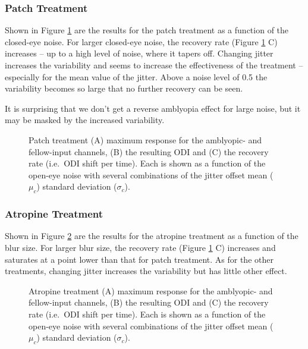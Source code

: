 \documentclass[
  onecolumn]{article}
\begin{document}
\hypertarget{patch-treatment-1}{%
\subsubsection{Patch Treatment}\label{patch-treatment-1}}

Shown in Figure \ref{fig:patch-response-ODI-blur} are the results for
the patch treatment as a function of the closed-eye noise. For larger
closed-eye noise, the recovery rate (Figure
\ref{fig:patch-response-ODI-blur} C) increases -- up to a high level of
noise, where it tapers off. Changing jitter increases the variability
and seems to increase the effectiveness of the treatment -- especially
for the mean value of the jitter. Above a noise level of 0.5 the
variability becomes so large that no further recovery can be seen.

It is surprising that we don't get a reverse amblyopia effect for large
noise, but it may be masked by the increased variability.

\begin{figure}
\hypertarget{fig:patch-response-ODI-blur}{%
\centering

\caption{Patch treatment (A) maximum response for the amblyopic- and
fellow-input channels, (B) the resulting ODI and (C) the recovery rate
(i.e.~ODI shift per time). Each is shown as a function of the open-eye
noise with several combinations of the jitter offset mean (\(\mu_c\))
standard deviation (\(\sigma_c\)).}\label{fig:patch-response-ODI-blur}
}
\end{figure}

\hypertarget{atropine-treatment-1}{%
\subsubsection{Atropine Treatment}\label{atropine-treatment-1}}

Shown in Figure \ref{fig:atropine-response-ODI-blur} are the results for
the atropine treatment as a function of the blur size. For larger blur
size, the recovery rate (Figure \ref{fig:patch-response-ODI-blur} C)
increases and saturates at a point lower than that for patch treatment.
As for the other treatments, changing jitter increases the variability
but has little other effect.

\begin{figure}
\hypertarget{fig:atropine-response-ODI-blur}{%
\centering

\caption{Atropine treatment (A) maximum response for the amblyopic- and
fellow-input channels, (B) the resulting ODI and (C) the recovery rate
(i.e.~ODI shift per time). Each is shown as a function of the open-eye
noise with several combinations of the jitter offset mean (\(\mu_c\))
standard deviation
(\(\sigma_c\)).}\label{fig:atropine-response-ODI-blur}
}
\end{figure}
\end{document}
